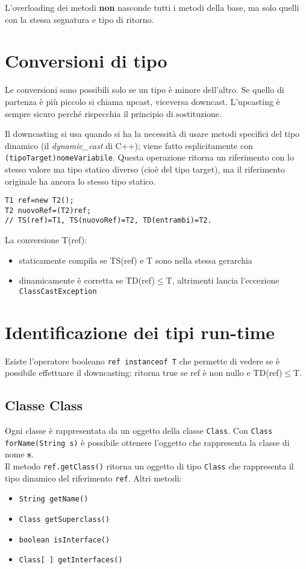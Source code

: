 L'overloading dei metodi \textbf{non} nasconde tutti i metodi della base, ma solo quelli con la stessa segnatura e tipo di ritorno.

\section{Conversioni di tipo} %
Le conversioni sono possibili solo se un tipo è minore dell'altro. Se quello di partenza è più piccolo si chiama upcast, viceversa downcast.
L'upcasting è sempre sicuro perché rispecchia il principio di sostituzione.

Il downcasting si usa quando si ha la necessità di usare metodi specifici del tipo dinamico (il \textit{dynamic\_cast} di C++); viene fatto esplicitamente con \texttt{(tipoTarget)nomeVariabile}. Questa operazione ritorna un riferimento con lo stesso valore ma tipo statico diverso (cioè del tipo target), ma il riferimento originale ha ancora lo stesso tipo statico.
\begin{lstlisting}
T1 ref=new T2();
T2 nuovoRef=(T2)ref;
// TS(ref)=T1, TS(nuovoRef)=T2, TD(entrambi)=T2.
\end{lstlisting}
La conversione T(ref):
\begin{itemize}
\item  staticamente compila se TS(ref) e T sono nella stessa gerarchia
\item  dinamicamente è corretta se TD(ref)$\le$T, altrimenti lancia l'eccezione \texttt{ClassCastException}
\end{itemize}

\section{Identificazione dei tipi run-time} %
Esiste l'operatore booleano \texttt{ref instanceof T} che permette di vedere se è possibile effettuare il downcasting; ritorna true se ref è non nullo e TD(ref)$\le$T.

\subsection{Classe Class}
Ogni classe è rappresentata da un oggetto della classe \texttt{Class}. Con \texttt{Class forName(String s)} è possibile ottenere l'oggetto che rappresenta la classe di nome \textbf{s}. \\
Il metodo \texttt{ref.getClass()} ritorna un oggetto di tipo \texttt{Class} che rappresenta il tipo dinamico del riferimento \texttt{ref}.
Altri metodi:
\begin{itemize}
\item \texttt{String getName()}
\item \texttt{Class getSuperclass()}
\item \texttt{boolean isInterface()}
\item \texttt{Class[ ] getInterfaces()}
\end{itemize}

